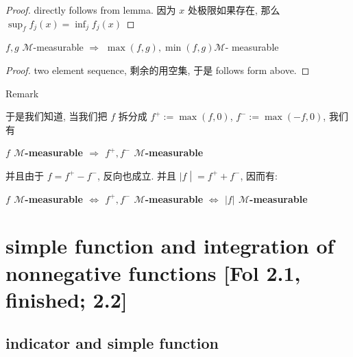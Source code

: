 \documentclass{qlnotes-export}
\begin{document}
\begin{proof}

directly follows from lemma. 因为 \(x\) 处极限如果存在, 那么 \(\sup_{f}f_{j}(x) = \inf_{j}f_{j}(x)\)

\end{proof}

\begin{corollary}\label{cor-04-measurable-functions-and-integration-on-l-mu-corollary-002}

\(f,g\) \(\mathcal{M}\)-measurable \(\Longrightarrow\) \(\max(f,g),\min(f,g)\)\(\mathcal{M}\)- measurable

\end{corollary}

\begin{proof}

two element sequence, 剩余的用空集, 于是 follows form above.

\end{proof}

\begin{qlremark}{Remark}

于是我们知道, 当我们把 \(f\) 拆分成 \(f^{+} := \max(f,0)\), \(f^{-} := \max( - f,0)\), 我们有

\textbf{\(f\) \(\mathcal{M}\)-measurable \(\Longrightarrow\) \(f^{+},f^{-}\) \(\mathcal{M}\)-measurable}

并且由于 \(f = f^{+} - f^{-}\), 反向也成立. 并且 \(\left. |f \middle| = f^{+} + f^{-} \right.\), 因而有:

\textbf{\(f\) \(\mathcal{M}\)-measurable \(\Leftrightarrow\) \(f^{+},f^{-}\) \(\mathcal{M}\)-measurable} \textbf{\(\Leftrightarrow\) \(|f|\) \(\mathcal{M}\)-measurable}

\end{qlremark}

\section{simple function and integration of nonnegative functions {[}Fol 2.1, finished; 2.2{]}}

\subsection{indicator and simple function}\label{indicator-and-simple-function}
\end{document}
